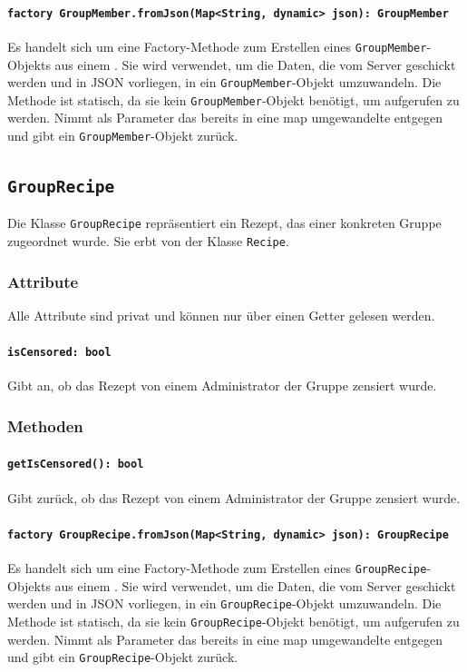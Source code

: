 \documentclass{entwurfsheft}
\begin{document}
\paragraph{\texttt{factory GroupMember.fromJson(Map<String, dynamic> json): GroupMember}} Es handelt sich um eine Factory-Methode zum Erstellen eines \texttt{GroupMember}-Objekts aus einem . Sie wird verwendet, um die Daten, die vom Server geschickt werden und in \Gls{JSON} vorliegen, in ein \texttt{GroupMember}-Objekt umzuwandeln. Die Methode ist statisch, da sie kein \texttt{GroupMember}-Objekt benötigt, um aufgerufen zu werden. Nimmt als Parameter das bereits in eine \Gls{map} umgewandelte  entgegen und gibt ein \texttt{GroupMember}-Objekt zurück.
\newpage
\subsection{\texttt{GroupRecipe}}\label{sec:grouprecipe}
Die Klasse \texttt{GroupRecipe} repräsentiert ein Rezept, das einer konkreten Gruppe zugeordnet wurde. Sie erbt von der Klasse \texttt{Recipe}.
\subsubsection*{Attribute}
Alle Attribute sind privat und können nur über einen Getter gelesen werden.
\paragraph{\texttt{isCensored: bool}}
Gibt an, ob das Rezept von einem Administrator der Gruppe zensiert wurde.
\subsubsection*{Methoden}
\paragraph{\texttt{getIsCensored(): bool}}
Gibt zurück, ob das Rezept von einem Administrator der Gruppe zensiert wurde.
\paragraph{\texttt{factory GroupRecipe.fromJson(Map<String, dynamic> json): GroupRecipe}} Es handelt sich um eine Factory-Methode zum Erstellen eines \texttt{GroupRecipe}-Objekts aus einem . Sie wird verwendet, um die Daten, die vom Server geschickt werden und in \Gls{JSON} vorliegen, in ein \texttt{GroupRecipe}-Objekt umzuwandeln. Die Methode ist statisch, da sie kein \texttt{GroupRecipe}-Objekt benötigt, um aufgerufen zu werden. Nimmt als Parameter das bereits in eine \Gls{map} umgewandelte  entgegen und gibt ein \texttt{GroupRecipe}-Objekt zurück.
\end{document}
